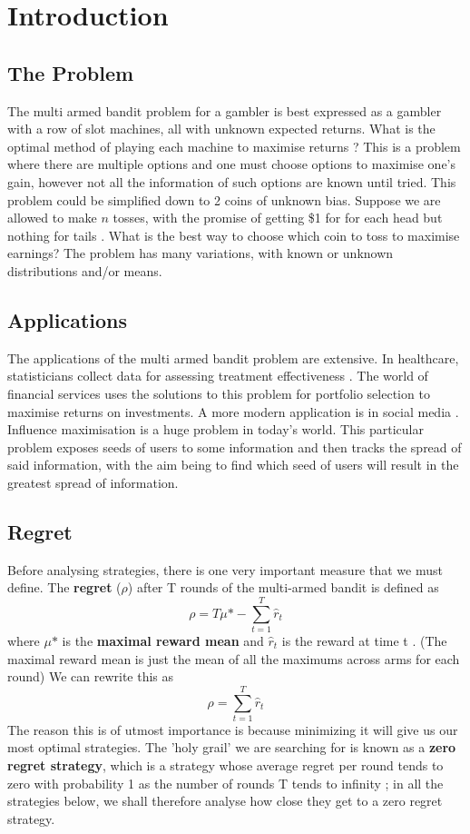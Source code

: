 \section{Introduction}
\subsection{The Problem}
The multi armed bandit problem for a gambler is best expressed as a gambler with a row of slot machines, all with unknown expected returns. What is the optimal method of playing each machine to maximise returns \citep{vermorel}? This is a problem where there are multiple options and one must choose options to maximise one's gain, however not all the information of such options are known until tried.
\newline
\newline
This problem could be simplified down to 2 coins of unknown bias. Suppose we are allowed to make $n$ tosses, with the promise of getting \$1 for for each head but nothing for tails \citep{robbins1952some}. What is the best way to choose which coin to toss to maximise earnings? The problem has many variations, with known or unknown distributions and/or means.

\subsection{Applications}
The applications of the multi armed bandit problem are extensive. In healthcare, statisticians collect data for assessing treatment effectiveness \citep{bouneffouf2019survey}. The world of financial services uses the solutions to this problem for portfolio selection to maximise returns on investments.
\newline
\newline
A more modern application is in social media \citep{chen2013combinatorial}. Influence maximisation is a huge problem in today's world. This particular problem exposes seeds of users to some information and then tracks the spread of said information, with the aim being to find which seed of users will result in the greatest spread of information.

\subsection{Regret}
Before analysing strategies, there is one very important measure that we must define. The \textbf{regret} ($\rho$) after T rounds of the multi-armed bandit is defined as $$\rho = T\mu\mbox{*} - \sum_{t=1}^T\hat{r}_t$$ where $\mu\mbox{*}$ is the \textbf{maximal reward mean} and $\hat{r}_t$ is the reward at time t \citep{vermorel}. (The maximal reward mean is just the mean of all the maximums across arms for each round) We can rewrite this as $$\rho = \sum_{t=1}^T\hat{r}_t$$ The reason this is of utmost importance is because minimizing it will give us our most optimal strategies. The 'holy grail' we are searching for is known as a \textbf{zero regret strategy}, which is a strategy whose average regret per round tends to zero with probability 1 as the number of rounds T tends to infinity \citep{vermorel}; in all the strategies below, we shall therefore analyse how close they get to a zero regret strategy.